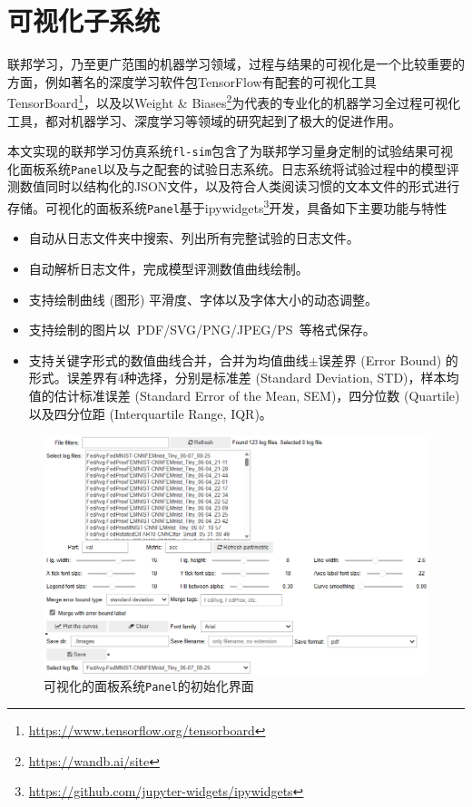 \section{可视化子系统}
\label{sec:chap5-viz}


联邦学习，乃至更广范围的机器学习领域，过程与结果的可视化是一个比较重要的方面，例如著名的深度学习软件包TensorFlow\cite{tensorflow}有配套的可视化工具TensorBoard\footnote{\url{https://www.tensorflow.org/tensorboard}}，以及以Weight \& Biases\footnote{\url{https://wandb.ai/site}}为代表的专业化的机器学习全过程可视化工具，都对机器学习、深度学习等领域的研究起到了极大的促进作用。

本文实现的联邦学习仿真系统\texttt{fl-sim}包含了为联邦学习量身定制的试验结果可视化面板系统\texttt{Panel}以及与之配套的试验日志系统。日志系统将试验过程中的模型评测数值同时以结构化的JSON文件，以及符合人类阅读习惯的文本文件的形式进行存储。可视化的面板系统\texttt{Panel}基于ipywidgets\footnote{\url{https://github.com/jupyter-widgets/ipywidgets}}开发，具备如下主要功能与特性
\begin{itemize}
    \item 自动从日志文件夹中搜索、列出所有完整试验的日志文件。
    \item 自动解析日志文件，完成模型评测数值曲线绘制。
    \item 支持绘制曲线 (图形) 平滑度、字体以及字体大小的动态调整。
    \item 支持绘制的图片以~PDF/SVG/PNG/JPEG/PS~等格式保存。
    \item 支持关键字形式的数值曲线合并，合并为均值曲线$\pm$误差界 (Error Bound) 的形式。误差界有4种选择，分别是标准差 (Standard Deviation, STD)，样本均值的估计标准误差 (Standard Error of the Mean, SEM)，四分位数 (Quartile)以及四分位距 (Interquartile Range, IQR)。
\end{itemize}

\begin{figure}[ht]
    \centering
    \includegraphics[width=\textwidth]{figures/panel-init.png}
    \caption{可视化的面板系统\texttt{Panel}的初始化界面}
    \label{fig:panel-init}
\end{figure}

